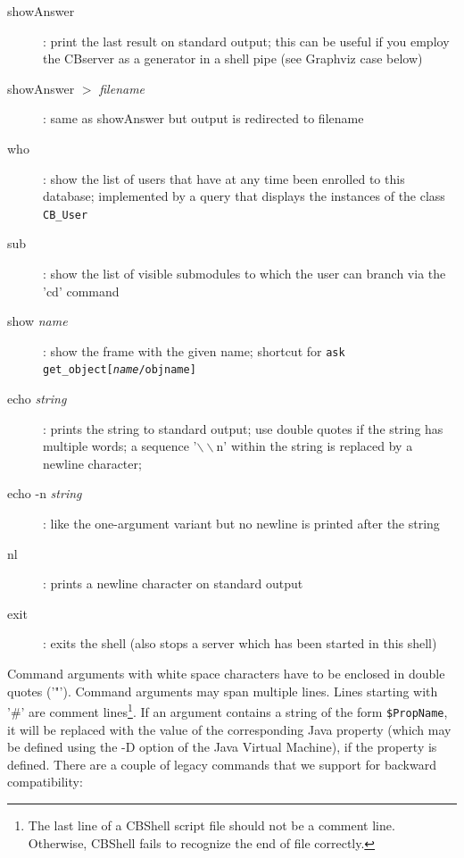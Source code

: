 \begin{description}
\item[showAnswer] :
      print the last result on standard output; this can be useful if you
      employ the CBserver as a generator in a shell pipe 
      (see Graphviz case below)

\item[showAnswer $>$ {\it filename}] :
      same as showAnswer but output is redirected to filename

\item[who] :
      show the list of users that have at any time been enrolled to this database;
      implemented by a query that displays the instances of the class {\tt CB\_User}

\item[sub] :
      show the list of visible submodules to which the user can branch via the 'cd' command

\item[show {\it name}] :
      show the frame with the given name; shortcut for
      {\tt ask get\_object[{\it name}/objname]}

\item[echo {\it string}] :
      prints the string to standard output; use double quotes if the string has multiple words;
      a sequence '$\backslash\backslash$n' within the string is replaced by a newline character; 

\item[echo -n {\it string}] :
      like the one-argument variant but no newline is printed after the string

\item[nl] :
      prints a newline character on standard output

\item[exit] :
      exits the shell (also stops a server which has been started in this shell)


\end{description}





Command arguments with white space characters have to be enclosed in double quotes ('"').
Command arguments may span multiple lines. Lines starting with '\#' are comment lines\footnote{
The last line of a CBShell script file should not be a comment line.
Otherwise, CBShell fails to recognize the end of file correctly.}.
If an argument contains a string of the form {\tt \$PropName}, it will be replaced with
the value of the corresponding Java property (which may be defined using the -D option
of the Java Virtual Machine), if the property is defined.
There are a couple of legacy commands that we support for backward compatibility:

